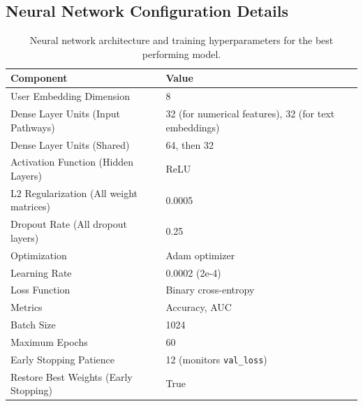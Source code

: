 \documentclass[
    a4paper, %
    10pt, %
    twoside, %
]{LTJournalArticle}
\begin{document}
\subsection{Neural Network Configuration Details}
\label{app:nn_config_details}

\begin{table}[H]
    \centering
    \begin{tabular}{p{}p{}}
        \hline
        \textbf{Component} & \textbf{Value} \\
        \hline
        User Embedding Dimension & 8 \\
        Dense Layer Units (Input Pathways) & 32 (for numerical features), 32 (for text embeddings) \\
        Dense Layer Units (Shared) & 64, then 32 \\
        Activation Function (Hidden Layers) & ReLU \\
        L2 Regularization (All weight matrices) & 0.0005 \\
        Dropout Rate (All dropout layers) & 0.25 \\
        Optimization & Adam optimizer \\
        Learning Rate & 0.0002 (2e-4) \\
        Loss Function & Binary cross-entropy  \\
        Metrics & Accuracy, AUC \\
        Batch Size & 1024 \\
        Maximum Epochs & 60 \\
        Early Stopping Patience & 12 (monitors \texttt{val\_loss}) \\
        Restore Best Weights (Early Stopping) & True \\
        \hline
    \end{tabular}
    \caption{Neural network architecture and training hyperparameters for the best performing model.}
    \label{tab:model-details}
\end{table}
\end{document}
